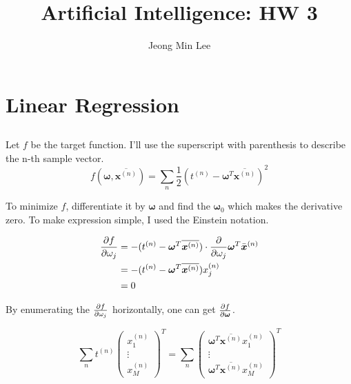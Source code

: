 \documentclass[12pt]{article}
\title{\textbf{Artificial Intelligence: HW 3}}
\author{Jeong Min Lee}
\begin{document}
\maketitle

\section{Linear Regression}
\subsection{}
Let $f$ be the target function. I'll use the superscript with parenthesis to describe the n-th sample vector.
\begin{equation}
    f(\boldsymbol{\omega},\overline{\boldsymbol{x}^{(n)}}) = \sum_n\frac{1}{2}\left(t^{(n)} - \boldsymbol{\omega}^T \overline{\boldsymbol{x}^{(n)}}\right)^2
\end{equation}

To minimize $f$, differentiate it by $\boldsymbol{\omega}$ and find the $\boldsymbol{\omega}_0$ which makes the derivative zero. To make expression simple, I used the Einstein notation. 

\begin{align*}
    {\partial f \over \partial \omega_j} &= -(t^{(n)} - \boldsymbol{\omega}^T \overline{\boldsymbol{x}^{(n)}}) \cdot {\partial \over \partial \omega_j} \boldsymbol{\omega}^T \bar{\boldsymbol{x}}^{(n)} \\
    &= -(t^{(n)} - \boldsymbol{\omega}^T \overline{\boldsymbol{x}^{(n)}}) x_j^{(n)}\\
    &=0
\end{align*}

By enumerating the ${\partial f \over \partial \omega_j}$ horizontally, one can get ${\partial f \over \partial \boldsymbol{\omega}}$.

\begin{equation}
    \sum_n t^{(n)}\begin{pmatrix} x^{(n)}_1 \\ \vdots \\ x^{(n)}_M \end{pmatrix}^T = \sum_n \begin{pmatrix} \boldsymbol{\omega}^T \overline{\boldsymbol{x}^{(n)}}x_1^{(n)} \\ \vdots \\ \boldsymbol{\omega}^T \overline{\boldsymbol{x}^{(n)}}x_M^{(n)} \end{pmatrix}^T
\end{equation}
\end{document}
